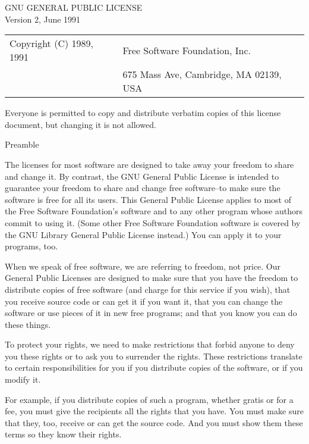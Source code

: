 {\small
\begin{center}
		    GNU GENERAL PUBLIC LICENSE \\
		       Version 2, June 1991  \\
\begin{tabular}{ll}
 Copyright (C) 1989, 1991 & Free Software Foundation, Inc.\\
                          & 675 Mass Ave, Cambridge, MA 02139, USA
\end{tabular}
\end{center}

 Everyone is permitted to copy and distribute verbatim copies
 of this license document, but changing it is not allowed.

\begin{center}
			    Preamble
\end{center}

  The licenses for most software are designed to take away your freedom
to share and change it.  By contrast, the GNU General Public License is
intended to guarantee your freedom to share and change free software--to
make sure the software is free for all its users.  This General Public
License applies to most of the Free Software Foundation's software and
to any other program whose authors commit to using it.  (Some other Free
Software Foundation software is covered by the GNU Library General
Public License instead.)  You can apply it to your programs, too.

  When we speak of free software, we are referring to freedom, not
price.  Our General Public Licenses are designed to make sure that you
have the freedom to distribute copies of free software (and charge for
this service if you wish), that you receive source code or can get it
if you want it, that you can change the software or use pieces of it
in new free programs; and that you know you can do these things.

  To protect your rights, we need to make restrictions that forbid
anyone to deny you these rights or to ask you to surrender the rights.
These restrictions translate to certain responsibilities for you if you
distribute copies of the software, or if you modify it.

  For example, if you distribute copies of such a program, whether
gratis or for a fee, you must give the recipients all the rights that
you have.  You must make sure that they, too, receive or can get the
source code.  And you must show them these terms so they know their
rights.

}
